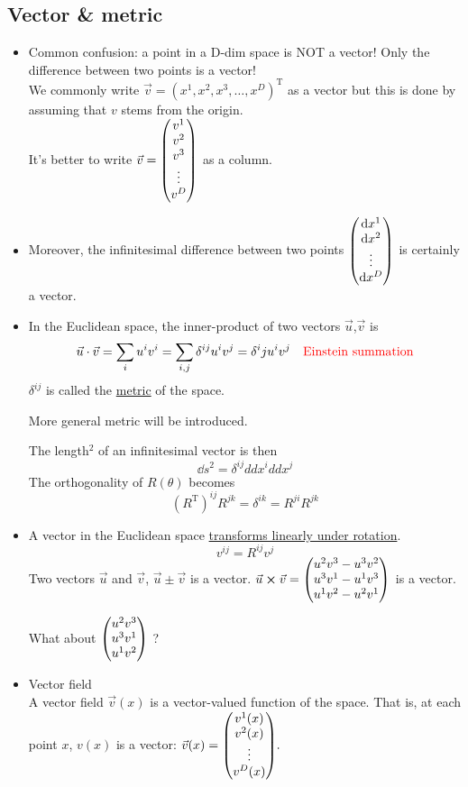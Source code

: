 \documentclass[11pt,fleqn]{book} %
\begin{document}
\subsection{Vector \& metric}
\begin{itemize}[label={--}, leftmargin=*]
\item Common confusion: a point in a D-dim space is \uppercase{not} a vector! Only the
  difference between two points is a vector! \\
  We commonly write \(\vec{v} = (x^1, x^2, x^3 ,\dots, x^D)^{\mathrm{T}}\) as a
  vector but this is done by assuming that \(v\) stems from the origin. \\
  It's better to write \(\vec{v} = \mqty(v^1\\v^2\\v^3\\\vdots\\v^D)\) as a column.
\item Moreover, the infinitesimal difference between two points
  \(\mqty(\dd x^1 \\ \dd x^2 \\ \vdots \\ \dd x^D)\) is
  certainly a vector.
\item In the Euclidean space, the inner-product of two vectors
  \(\vec{u}\),\(\vec{v}\) is \[\vec{u} \cdot \vec{v} = \sum_i u^i v^i =
    \sum_{i,j} \delta^{ij} u^i v^j = \delta^ij u^i v^j \quad \text{\textcolor{red}{Einstein
    summation}}\]
  \(\delta^{ij}\) is called the \uline{metric} of the space. \\
  \begin{remark}
    More general metric will be introduced.
  \end{remark}
  The length\(^2\) of an infinitesimal vector is then
  \[\dd s^2 = \delta^{ij} dd x^i dd x^j\]
  The orthogonality of \(R(\theta)\) becomes
  \[\left(R^{\mathrm{T}}\right)^{ij} R^{jk} = \delta^{ik} = R^{ji} R^{jk}\]
\item A vector in the Euclidean space \uline{transforms linearly under rotation}.
  \[v^{ij} = R^{ij} v^j\]
  Two vectors \(\vec{u}\) and \(\vec{v}\), \(\vec{u} \pm \vec{v}\) is a vector.
  \(\vec{u} \cross \vec{v} = \mqty(u^2 v^3 - u^3 v^2 \\ u^3 v^1 - u^1 v^3 \\ u^1
  v^2 - u^2 v^1)\) is a vector.
  \begin{problem}
    What about \(\mqty(u^2 v^3 \\ u^3 v^1 \\ u^1 v^2)\) ?
  \end{problem}
\item Vector field \\
  A vector field \(\vec{v}(x)\) is a vector-valued function of the space. That
  is, at each point \(x\), \(v(x)\) is a vector:
  \(\vec{v}(x) = \mqty(v^1(x) \\ v^2(x) \\ \vdots \\ v^D(x)).\)
\end{itemize}
\end{document}
